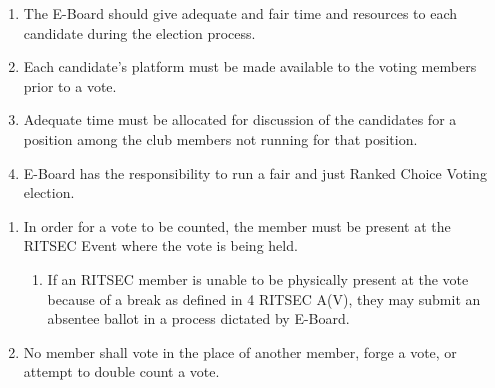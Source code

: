 


\begin{enumerate}
	\item The E-Board should give adequate and fair time and resources to each candidate
	      during the election process.
	\item Each candidate's platform must be made available to the voting members prior to
	      a vote.
	\item Adequate time must be allocated for discussion of the candidates for a position
	      among the club members not running for that position.
	\item E-Board has the responsibility to run a fair and just Ranked Choice Voting
	      election.
\end{enumerate}


\begin{enumerate}
	\item In order for a vote to be counted, the member must be present at the RITSEC
	      Event where the vote is being held.
	      \begin{enumerate}
		      \item If an RITSEC member is unable to be physically present at the vote because of a
		            break as defined in 4 RITSEC A(V), they may submit an absentee ballot in a
		            process dictated by E-Board.
	      \end{enumerate}
	\item No member shall vote in the place of another member, forge a vote, or attempt
	      to double count a vote.
\end{enumerate}


